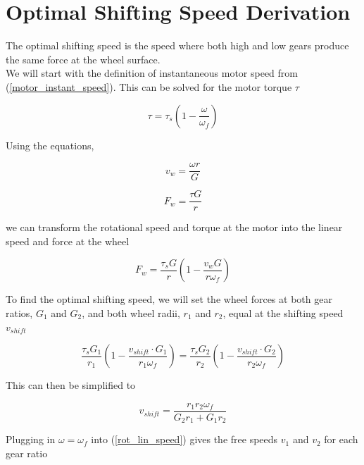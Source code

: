 \documentclass[11pt,a4paper,titlepage]{article}
\begin{document}
	\section{Optimal Shifting Speed Derivation} \label{shift_speed_appendix}
	The optimal shifting speed is the speed where both high and low gears produce the same force at the wheel surface.\\
	
	We will start with the definition of instantaneous motor speed from (\ref{motor_instant_speed}). This can be solved for the motor torque $\tau$
	
	\begin{equation}
		\tau = \tau_s \left( 1 - \frac{\omega}{\omega_f} \right)
	\end{equation}
	
	Using the equations,
	
	\begin{equation} \label{rot_lin_speed}
		v_w = \frac{\omega r}{G}
	\end{equation}
	
	\begin{equation}
		F_w = \frac{\tau G}{r}
	\end{equation}
	
	we can transform the rotational speed and torque at the motor into the linear speed and force at the wheel
	
	\begin{equation}
		F_w = \frac{\tau_s G}{r} \left( 1 - \frac{v_w G}{r \omega_f} \right)
	\end{equation}
	
	To find the optimal shifting speed, we will set the wheel forces at both gear ratios, $G_1$ and $G_2$, and both wheel radii, $r_1$ and $r_2$, equal at the shifting speed $v_{shift}$
	
	\begin{equation}
		\frac{\tau_s G_1}{r_1} \left( 1 - \frac{v_{shift} \cdot G_1}{r_1 \omega_f} \right) = \frac{\tau_s G_2}{r_2} \left( 1 - \frac{v_{shift} \cdot G_2}{r_2 \omega_f} \right)
	\end{equation}
	
	This can then be simplified to 
	
	\begin{equation} \label{v_shift_pre}
		v_{shift} = \frac{r_1 r_2 \omega_f}{G_2 r_1 + G_1 r_2}
	\end{equation}
	
	Plugging in $\omega = \omega_f$ into (\ref{rot_lin_speed}) gives the free speeds $v_1$ and $v_2$ for each gear ratio
	
\end{document}
